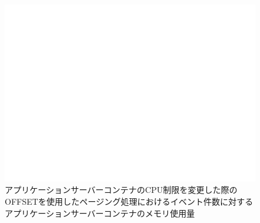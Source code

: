 \documentclass[../../../../../main]{subfiles}
\begin{document}
    \begin{figure}[H]
        \centering
        \includegraphics[width=12cm]{graph}
        \caption{アプリケーションサーバーコンテナのCPU制限を変更した際のOFFSETを使用したページング処理におけるイベント件数に対するアプリケーションサーバーコンテナのメモリ使用量}
        \label{fig:paging-offset-change-app-cpu-limit-app-memory-app_1024-db_1_1024}
    \end{figure}
\end{document}
